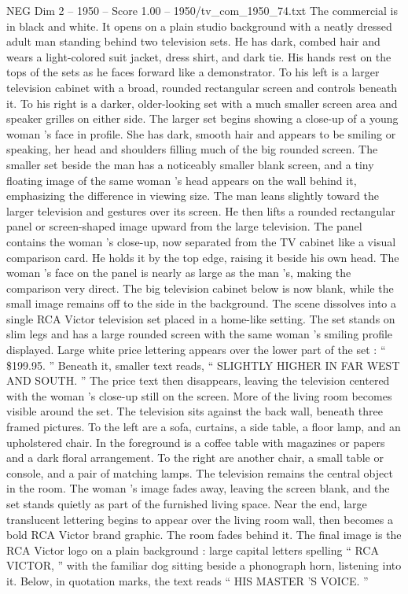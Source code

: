 \begin{textsample}{NEG Dim 2 – 1950 – Score 1.00 – 1950/tv\_com\_1950\_74.txt}  \label{ex:f2_neg_015}
The commercial is in black and white.
It opens on a plain studio background with a neatly dressed adult man standing behind two television sets.
He has dark, combed hair and wears a light-colored suit jacket, dress shirt, and dark tie.
His hands rest on the tops of the sets as he faces forward like a demonstrator.
To his left is a larger television cabinet with a broad, rounded rectangular screen and controls beneath it.
To his right is a darker, older-looking set with a much smaller screen area and speaker grilles on either side.
The larger set begins showing a close-up of a young woman ’s face in profile.
She has dark, smooth hair and appears to be smiling or speaking, her head and shoulders filling much of the big rounded screen.
The smaller set beside the man has a noticeably smaller blank screen, and a tiny floating image of the same woman ’s head appears on the wall behind it, emphasizing the difference in viewing size.
The man leans slightly toward the larger television and gestures over its screen.
He then lifts a rounded rectangular panel or screen-shaped image upward from the large television.
The panel contains the woman ’s close-up, now separated from the TV cabinet like a visual comparison card.
He holds it by the top edge, raising it beside his own head.
The woman ’s face on the panel is nearly as large as the man ’s, making the comparison very direct.
The big television cabinet below is now blank, while the small image remains off to the side in the background.
The scene dissolves into a single RCA Victor television set placed in a home-like setting.
The set stands on slim legs and has a large rounded screen with the same woman ’s smiling profile displayed.
Large white price lettering appears over the lower part of the set : “ \$199.95. ” Beneath it, smaller text reads, “ SLIGHTLY HIGHER IN FAR WEST AND SOUTH. ” The price text then disappears, leaving the television centered with the woman ’s close-up still on the screen.
More of the living room becomes visible around the set.
The television sits against the back wall, beneath three framed pictures.
To the left are a sofa, curtains, a side table, a floor lamp, and an upholstered chair.
In the foreground is a coffee table with magazines or papers and a dark floral arrangement.
To the right are another chair, a small table or console, and a pair of matching lamps.
The television remains the central object in the room.
The woman ’s image fades away, leaving the screen blank, and the set stands quietly as part of the furnished living space.
Near the end, large translucent lettering begins to appear over the living room wall, then becomes a bold RCA Victor brand graphic.
The room fades behind it.
The final image is the RCA Victor logo on a plain background : large capital letters spelling “ RCA VICTOR, ” with the familiar dog sitting beside a phonograph horn, listening into it.
Below, in quotation marks, the text reads “ HIS MASTER ’S VOICE. ”

\end{textsample}
